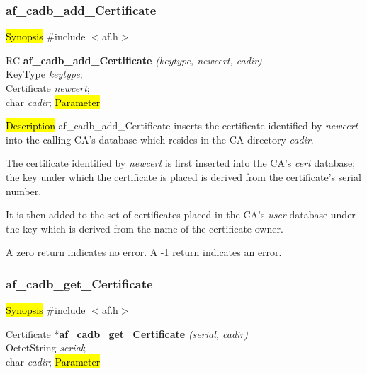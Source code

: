 \subsubsection{af\_cadb\_add\_Certificate}
\label{af_cadb_add_Certificate}
\hl{Synopsis}
\#include $<$af.h$>$

RC {\bf af\_cadb\_add\_Certificate} {\em (keytype, newcert, cadir)} \\
KeyType     {\em keytype}; \\
Certificate {\em *newcert}; \\
char	    {\em *cadir};
\hl{Parameter}



\hl{Description}
af\_cadb\_add\_Certificate inserts the certificate identified by {\em newcert} into the 
calling CA's database which resides in the CA directory {\em cadir}. 

The certificate identified by {\em newcert} is first inserted into the CA's {\em cert} database;
the key under which the certificate is placed is derived from the certificate's serial number.

It is then added to the set of certificates placed in the CA's {\em user} database under the key
which is derived from the name of the certificate owner.

A zero return indicates no error.
A -1 return indicates an error.



\subsubsection{af\_cadb\_get\_Certificate}
\label{af_cadb_get_Certificate}
\hl{Synopsis}
\#include $<$af.h$>$

Certificate *{\bf af\_cadb\_get\_Certificate} {\em (serial, cadir)} \\
OctetString {\em *serial}; \\
char {\em *cadir};
\hl{Parameter}

